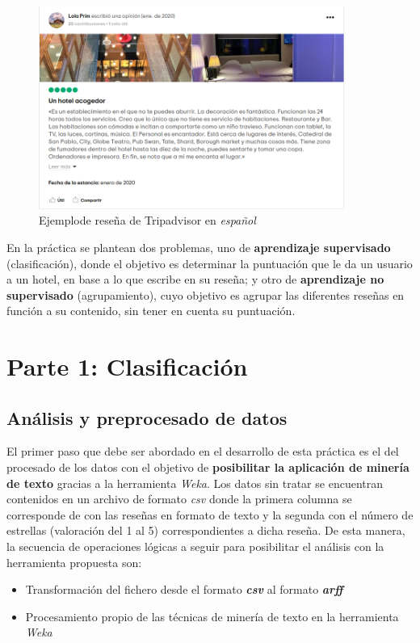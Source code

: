 \documentclass[12pt,a4paper, xcolor=table]{article}
\begin{document}
    \begin{figure}[!h]
      \centering
      \includegraphics[width=10cm]{img/tripadvisor-review.png}
      \caption{Ejemplode reseña de Tripadvisor en \textit{español}}
    \end{figure}

    En la práctica se plantean dos problemas, uno de \textbf{aprendizaje supervisado} (clasificación), donde el objetivo es determinar la puntuación que le da un usuario a un hotel, en base a lo que escribe en su reseña; y otro de \textbf{aprendizaje no supervisado} (agrupamiento), cuyo objetivo es agrupar las diferentes reseñas en función a su contenido, sin tener en cuenta su puntuación.

    \vspace{3mm}


\section{Parte 1: Clasificación}
    \subsection{Análisis y preprocesado de datos}
        El primer paso que debe ser abordado en el desarrollo de esta práctica es el del procesado de los datos con el objetivo de \textbf{posibilitar la aplicación de minería de texto} gracias a la herramienta \textit{Weka}. Los datos sin tratar se encuentran contenidos en un archivo de formato \textit{csv} donde la primera columna se corresponde de con las reseñas en formato de texto y la segunda con el número de estrellas (valoración del 1 al 5) correspondientes a dicha reseña. De esta manera, la secuencia de operaciones lógicas a seguir para posibilitar el análisis con la herramienta propuesta son:

        \begin{itemize}
        \item Transformación del fichero desde el formato \textbf{\textit{csv}} al formato \textbf{\textit{arff}}
        \item Procesamiento propio de las técnicas de minería de texto en la herramienta \textit{Weka}
        \end{itemize}
\end{document}
